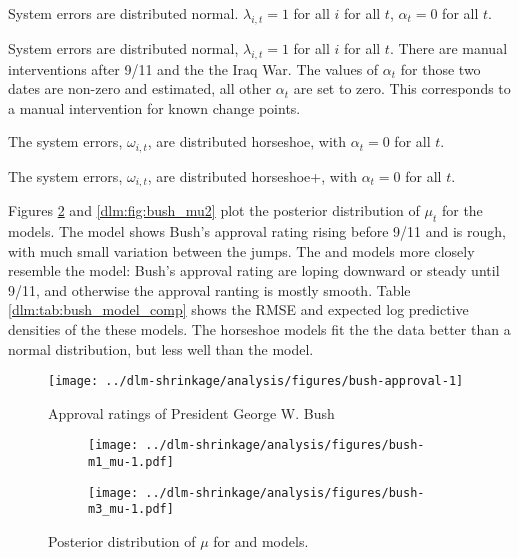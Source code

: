 \begin{description}[font = \normalfont\ModelII]
\item[Normal]
  System errors are distributed normal.
  $\lambda_{i, t} = 1$  for all $i$ for all $t$, $\alpha_{t} = 0$ for all $t$.
\item[Intervention]
  System errors are distributed normal, $\lambda_{i, t} = 1$  for all $i$ for all $t$.
  There are manual interventions after 9/11 and the the Iraq War. 
  The values of $\alpha_{t}$ for those two dates are non-zero and estimated, all other $\alpha_{t}$ are set to zero.
  This corresponds to a manual intervention for known change points.
\item[Horseshoe] The system errors, $\omega_{i,t}$, are distributed horseshoe, with $\alpha_{t} = 0$ for all $t$.
\item[Horseshoe+] The system errors, $\omega_{i,t}$, are distributed horseshoe+, with  $\alpha_{t}= 0$ for all $t$.
\end{description}


Figures \ref{dlm:fig:bush_mu1} and \ref{dlm:fig:bush_mu2} plot the posterior distribution of $\mu_{t}$ for the models.
The  model shows Bush's approval rating rising before 9/11 and is rough, with much small variation between the jumps.
The  and  models more closely resemble the  model:
Bush's approval rating are loping downward or steady until 9/11, and otherwise the approval ranting is mostly smooth.
Table \ref{dlm:tab:bush_model_comp} shows the RMSE and expected log predictive densities of the these models. 
The horseshoe models fit the the data better than a normal distribution, but less well than the  model.

\begin{figure}[thbp!]
  \centering
  \texttt{[image: ../dlm-shrinkage/analysis/figures/bush-approval-1]}
  \caption{Approval ratings of President George W. Bush}
  \label{dlm:fig:bush_approval}
\end{figure}

\begin{figure}[thbp!]
  \centering
  \begin{subfigure}[b]{\linewidth}
    \texttt{[image: ../dlm-shrinkage/analysis/figures/bush-m1\_mu-1.pdf]}
    \caption{}
  \end{subfigure}

  \begin{subfigure}[b]{\linewidth}
    \texttt{[image: ../dlm-shrinkage/analysis/figures/bush-m3\_mu-1.pdf]}
    \caption{}
  \end{subfigure}
  \caption{Posterior distribution of $\mu$ for  and  models.}
  \label{dlm:fig:bush_mu1}
\end{figure}

